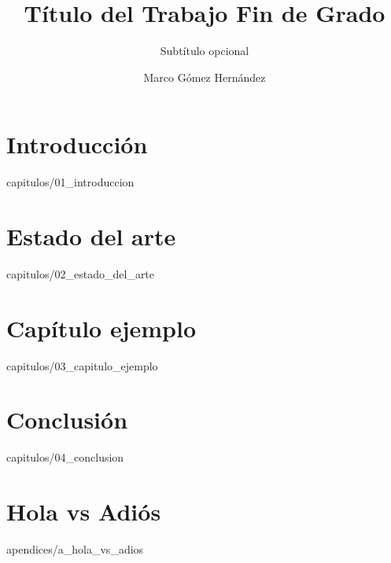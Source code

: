 \documentclass[epsbased,gnuplot,copyright,final,covers,extendedindex,firstnumbered,tfg,loa,loc,loe,lof,lot,lotb]{tfgtfmthesisuam}
\title{Título del Trabajo Fin de Grado}
\subtitle{Subtítulo opcional}
\author{Marco Gómez Hernández}
\begin{document}
\chapter{Introducción\label{CAP:INTRO}}{capitulos/01_introduccion}
\chapter{Estado del arte\label{CAP:ESTADOARTE}}{capitulos/02_estado_del_arte}
\chapter{Capítulo ejemplo\label{CAP:CAPITULOEJEMPLO}}{capitulos/03_capitulo_ejemplo}
\chapter{Conclusión\label{CAP:CONCLUSION}}{capitulos/04_conclusion}

\appendix

\chapter{Hola vs Adiós\label{CAP:HOLAVSADIOS}}{apendices/a_hola_vs_adios}
\end{document}
